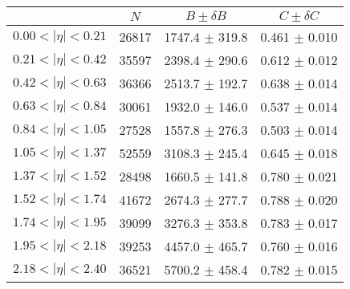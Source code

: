 \begin{tabular}{lccc}
\hline
    &   $N$   & $B \pm \delta B$  &  $C \pm \delta C$ \\
\hline
$0.00 < |\eta| <0.21$          & 26817      & 1747.4     $\pm$ 319.8 & 0.461      $\pm$ 0.010 \\
$0.21 < |\eta| <0.42$          & 35597      & 2398.4     $\pm$ 290.6 & 0.612      $\pm$ 0.012 \\
$0.42 < |\eta| <0.63$          & 36366      & 2513.7     $\pm$ 192.7 & 0.638      $\pm$ 0.014 \\
$0.63 < |\eta| <0.84$          & 30061      & 1932.0     $\pm$ 146.0 & 0.537      $\pm$ 0.014 \\
$0.84 < |\eta| <1.05$          & 27528      & 1557.8     $\pm$ 276.3 & 0.503      $\pm$ 0.014 \\
$1.05 < |\eta| <1.37$          & 52559      & 3108.3     $\pm$ 245.4 & 0.645      $\pm$ 0.018 \\
$1.37 < |\eta| <1.52$          & 28498      & 1660.5     $\pm$ 141.8 & 0.780      $\pm$ 0.021 \\
$1.52 < |\eta| <1.74$          & 41672      & 2674.3     $\pm$ 277.7 & 0.788      $\pm$ 0.020 \\
$1.74 < |\eta| <1.95$          & 39099      & 3276.3     $\pm$ 353.8 & 0.783      $\pm$ 0.017 \\
$1.95 < |\eta| <2.18$          & 39253      & 4457.0     $\pm$ 465.7 & 0.760      $\pm$ 0.016 \\
$2.18 < |\eta| <2.40$          & 36521      & 5700.2     $\pm$ 458.4 & 0.782      $\pm$ 0.015 \\
\hline
\end{tabular}

